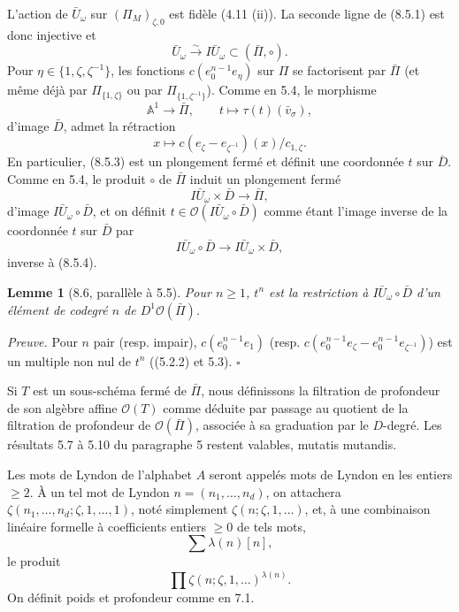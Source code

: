 \documentclass[10pt,a4paper]{article}
\newcommand{\A}{\mathbb A}
\newcommand{\OO}{\mathcal O}
\theoremstyle{deligne}
\newtheorem*{lemma*}{Lemme}
\newenvironment{proofdel}{\textit{Preuve.}}{\hfill$\square$}
\newcommand{\heading}[1]{\vspace{0.65em}\noindent{\bfseries #1}\quad}
\begin{document}
L'action de \(\bar U_\omega\) sur \((\Pi_M)_{\zeta,0}\) est fidèle (4.11 (ii)). La seconde ligne de (8.5.1) est donc injective et
\[
\tag{8.5.2}
\bar U_\omega\overset{\sim}{\longrightarrow}I\bar U_\omega\subset(\bar\Pi,\circ).
\]
Pour \(\eta\in\{1,\zeta,\zeta^{-1}\}\), les fonctions \(c(e_0^{n-1}e_\eta)\) sur \(\Pi\) se factorisent par \(\bar\Pi\) (et même déjà par \(\Pi_{\{1,\zeta\}}\) ou par \(\Pi_{\{1,\zeta^{-1}\}}\)). Comme en 5.4, le morphisme
\[
\tag{8.5.3}
\A^1\longrightarrow\bar\Pi,\qquad t\longmapsto\tau(t)(\bar v_\sigma),
\]
d'image \(\bar D\), admet la rétraction
\[
x\longmapsto c(e_\zeta-e_{\zeta^{-1}})(x)/c_{1,\zeta}.
\]
En particulier, (8.5.3) est un plongement fermé et définit une coordonnée \(t\) sur \(\bar D\). Comme en 5.4, le produit \(\circ\) de \(\bar\Pi\) induit un plongement fermé
\[
\tag{8.5.4}
I\bar U_\omega\times\bar D\longrightarrow\bar\Pi,
\]
d'image \(I\bar U_\omega\circ\bar D\), et on définit \(t\in\OO(I\bar U_\omega\circ\bar D)\) comme étant l'image inverse de la coordonnée \(t\) sur \(\bar D\) par
\[
\tag{8.5.5}
I\bar U_\omega\circ\bar D\longrightarrow I\bar U_\omega\times\bar D,
\]
inverse à (8.5.4).

\begin{lemma*}[8.6, parallèle à 5.5]
Pour \(n\ge1\), \(t^n\) est la restriction à \(I\bar U_\omega\circ\bar D\) d'un élément de codegré \(n\) de \(D^1\OO(\bar\Pi)\).
\end{lemma*}

\begin{proofdel}
Pour \(n\) pair (resp. impair), \(c(e_0^{n-1}e_1)\) (resp. \(c(e_0^{n-1}e_\zeta-e_0^{n-1}e_{\zeta^{-1}})\)) est un multiple non nul de \(t^n\) ((5.2.2) et 5.3).
\end{proofdel}

\heading{8.7.} Si \(T\) est un sous-schéma fermé de \(\bar\Pi\), nous définissons la filtration de profondeur de son algèbre affine \(\OO(T)\) comme déduite par passage au quotient de la filtration de profondeur de \(\OO(\bar\Pi)\), associée à sa graduation par le \(D\)-degré. Les résultats 5.7 à 5.10 du paragraphe 5 restent valables, mutatis mutandis.

\heading{8.8.} Les mots de Lyndon de l'alphabet \(A\) seront appelés mots de Lyndon en les entiers \(\ge2\). À un tel mot de Lyndon \(n=(n_1,\ldots,n_d)\), on attachera \(\zeta(n_1,\ldots,n_d;\zeta,1,\ldots,1)\), noté simplement \(\zeta(n;\zeta,1,\ldots)\), et, à une combinaison linéaire formelle à coefficients entiers \(\ge0\) de tels mots,
\[
\sum\lambda(n)[n],
\]
le produit
\[
\prod\zeta(n;\zeta,1,\ldots)^{\lambda(n)}.
\]
On définit poids et profondeur comme en 7.1.
\end{document}
